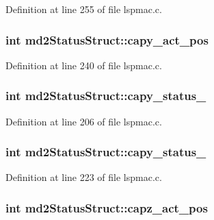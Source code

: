 Definition at line 255 of file lspmac.c.\hypertarget{structmd2StatusStruct_ae25122a6db146501b51609b9cb59b044}{
\subsubsection[{capy\_\-act\_\-pos}]{\setlength{\rightskip}{0pt plus 5cm}int {\bf md2StatusStruct::capy\_\-act\_\-pos}}}
\label{structmd2StatusStruct_ae25122a6db146501b51609b9cb59b044}


Definition at line 240 of file lspmac.c.\hypertarget{structmd2StatusStruct_a7f4e945e80b1980b9e69366a69ad79cc}{
\subsubsection[{capy\_\-status\_\-1}]{\setlength{\rightskip}{0pt plus 5cm}int {\bf md2StatusStruct::capy\_\-status\_}}}
\label{structmd2StatusStruct_a7f4e945e80b1980b9e69366a69ad79cc}


Definition at line 206 of file lspmac.c.\hypertarget{structmd2StatusStruct_a5d7c10d9a16ebcc53ac4a0770ab2ef62}{
\subsubsection[{capy\_\-status\_\-2}]{\setlength{\rightskip}{0pt plus 5cm}int {\bf md2StatusStruct::capy\_\-status\_}}}
\label{structmd2StatusStruct_a5d7c10d9a16ebcc53ac4a0770ab2ef62}


Definition at line 223 of file lspmac.c.\hypertarget{structmd2StatusStruct_a257c04efac3a33d5d34b21d64c6f1266}{
\subsubsection[{capz\_\-act\_\-pos}]{\setlength{\rightskip}{0pt plus 5cm}int {\bf md2StatusStruct::capz\_\-act\_\-pos}}}
\label{structmd2StatusStruct_a257c04efac3a33d5d34b21d64c6f1266}


